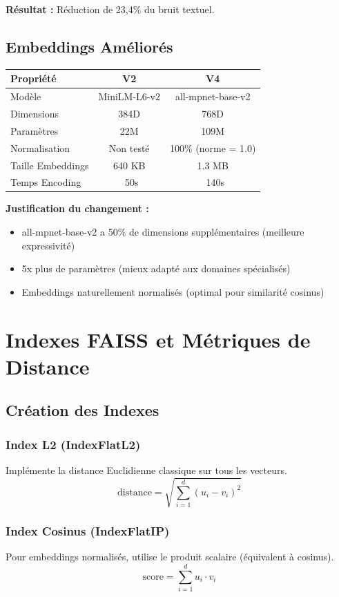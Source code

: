 \documentclass[12pt,a4paper]{article}
\begin{document}
\textbf{Résultat :} Réduction de 23,4\% du bruit textuel.

\subsection{Embeddings Améliorés}

\begin{center}
\begin{tabular}{|l|c|c|}
\hline
\textbf{Propriété} & \textbf{V2} & \textbf{V4} \\
\hline
Modèle & MiniLM-L6-v2 & all-mpnet-base-v2 \\
Dimensions & 384D & 768D \\
Paramètres & 22M & 109M \\
Normalisation & Non testé & 100\% (norme = 1.0) \\
Taille Embeddings & 640 KB & 1.3 MB \\
Temps Encoding & ~50s & ~140s \\
\hline
\end{tabular}
\end{center}

\textbf{Justification du changement :}
\begin{itemize}
    \item all-mpnet-base-v2 a 50\% de dimensions supplémentaires (meilleure expressivité)
    \item 5x plus de paramètres (mieux adapté aux domaines spécialisés)
    \item Embeddings naturellement normalisés (optimal pour similarité cosinus)
\end{itemize}

\section{Indexes FAISS et Métriques de Distance}

\subsection{Création des Indexes}

\subsubsection{Index L2 (IndexFlatL2)}
Implémente la distance Euclidienne classique sur tous les vecteurs.
$$\text{distance} = \sqrt{\sum_{i=1}^{d} (u_i - v_i)^2}$$

\subsubsection{Index Cosinus (IndexFlatIP)}
Pour embeddings normalisés, utilise le produit scalaire (équivalent à cosinus).
$$\text{score} = \sum_{i=1}^{d} u_i \cdot v_i$$
\end{document}
